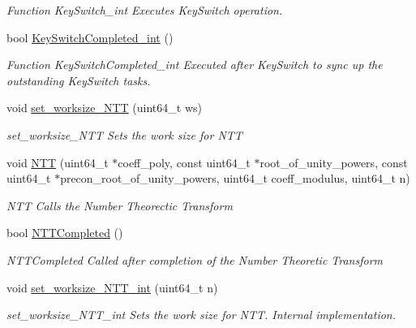 \begin{DoxyCompactItemize}
\begin{DoxyCompactList}\small\item\em Function Key\-Switch\-\_\-int Executes Key\-Switch operation. \end{DoxyCompactList}\item 
bool \hyperlink{namespaceintel_1_1hexl_1_1fpga_a4b63f0f7b4b53590cece381d425c1af0}{Key\-Switch\-Completed\-\_\-int} ()
\begin{DoxyCompactList}\small\item\em Function Key\-Switch\-Completed\-\_\-int Executed after Key\-Switch to sync up the outstanding Key\-Switch tasks. \end{DoxyCompactList}\item 
void \hyperlink{namespaceintel_1_1hexl_1_1fpga_a395d82d33eb68a64244bddc0bd857121}{set\-\_\-worksize\-\_\-\-N\-T\-T} (uint64\-\_\-t ws)
\begin{DoxyCompactList}\small\item\em set\-\_\-worksize\-\_\-\-N\-T\-T Sets the work size for N\-T\-T \end{DoxyCompactList}\item 
void \hyperlink{namespaceintel_1_1hexl_1_1fpga_ab91e470f9e47aa685e33f265926f6af0}{N\-T\-T} (uint64\-\_\-t $\ast$coeff\-\_\-poly, const uint64\-\_\-t $\ast$root\-\_\-of\-\_\-unity\-\_\-powers, const uint64\-\_\-t $\ast$precon\-\_\-root\-\_\-of\-\_\-unity\-\_\-powers, uint64\-\_\-t coeff\-\_\-modulus, uint64\-\_\-t n)
\begin{DoxyCompactList}\small\item\em N\-T\-T Calls the Number Theorectic Transform \end{DoxyCompactList}\item 
bool \hyperlink{namespaceintel_1_1hexl_1_1fpga_ab56525682080c2627f29893276ee8415}{N\-T\-T\-Completed} ()
\begin{DoxyCompactList}\small\item\em N\-T\-T\-Completed Called after completion of the Number Theoretic Transform \end{DoxyCompactList}\item 
void \hyperlink{namespaceintel_1_1hexl_1_1fpga_a4f302a0544c58e8ed0b9818b891ced05}{set\-\_\-worksize\-\_\-\-N\-T\-T\-\_\-int} (uint64\-\_\-t n)
\begin{DoxyCompactList}\small\item\em set\-\_\-worksize\-\_\-\-N\-T\-T\-\_\-int Sets the work size for N\-T\-T. Internal implementation. \end{DoxyCompactList}\item 

\end{DoxyCompactItemize}
